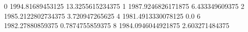 0 1994.81689453125 13.3255615234375
1 1987.9246826171875 6.433349609375
2 1985.2122802734375 3.720947265625
4 1981.4913330078125 0.0
6 1982.27880859375 0.7874755859375
8 1984.0946044921875 2.603271484375

